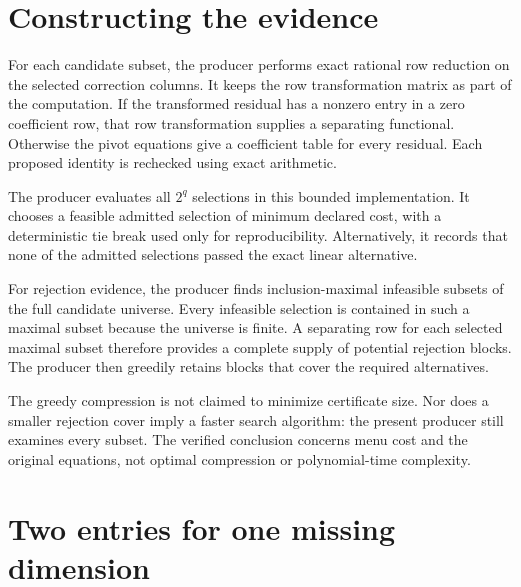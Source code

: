 \documentclass[11pt,letterpaper,oneside,openany]{book}
\theoremstyle{quiet}
\begin{document}
\section{Constructing the evidence}

For each candidate subset, the producer performs exact rational row reduction on the selected correction columns. It keeps the row transformation matrix as part of the computation. If the transformed residual has a nonzero entry in a zero coefficient row, that row transformation supplies a separating functional. Otherwise the pivot equations give a coefficient table for every residual. Each proposed identity is rechecked using exact arithmetic.

The producer evaluates all $2^q$ selections in this bounded implementation. It chooses a feasible admitted selection of minimum declared cost, with a deterministic tie break used only for reproducibility. Alternatively, it records that none of the admitted selections passed the exact linear alternative.

For rejection evidence, the producer finds inclusion-maximal infeasible subsets of the full candidate universe. Every infeasible selection is contained in such a maximal subset because the universe is finite. A separating row for each selected maximal subset therefore provides a complete supply of potential rejection blocks. The producer then greedily retains blocks that cover the required alternatives.

The greedy compression is not claimed to minimize certificate size. Nor does a smaller rejection cover imply a faster search algorithm: the present producer still examines every subset. The verified conclusion concerns menu cost and the original equations, not optimal compression or polynomial-time complexity.

\section{Two entries for one missing dimension}
\end{document}
